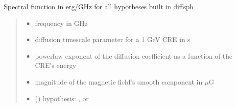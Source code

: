 \documentclass[letterpaper,10pt,english]{sphinxmanual}
\begin{document}
\begin{fulllineitems}
\label{\detokenize{diffsph.spectra:diffsph.spectra.synchrotron.X}}
\pysigstartsignatures
{}
\pysigstopsignatures
\sphinxAtStartPar
Spectral function in erg/GHz for all hypotheses built in diffsph
\begin{quote}\begin{description}
\begin{itemize}
\item {} 
\sphinxAtStartPar
{} \textendash{} frequency in GHz

\item {} 
\sphinxAtStartPar
{} \textendash{} diffusion time\sphinxhyphen{}scale parameter for a 1 GeV CRE in s

\item {} 
\sphinxAtStartPar
{} \textendash{} power\sphinxhyphen{}law exponent of the diffusion coefficient as a function of the CRE’s energy

\item {} 
\sphinxAtStartPar
{} \textendash{} magnitude of the magnetic field’s smooth component in \(\mu\)G

\item {} 
\sphinxAtStartPar
{} () \textendash{} hypothesis: ,  or 

\end{itemize}

\end{description}\end{quote}

\begin{DUlineblock}{0em}
\item[] 
\end{DUlineblock}


\end{fulllineitems}
\end{document}
